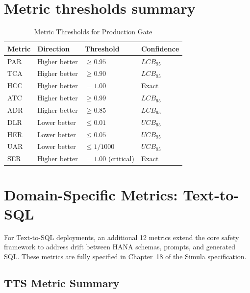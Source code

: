 \section{Metric thresholds summary}

\begin{table}[htbp]
\centering
\caption{Metric Thresholds for Production Gate}
\label{tab:thresholds}
\begin{tabular}{l l l l}
\toprule
\textbf{Metric} & \textbf{Direction} & \textbf{Threshold} & \textbf{Confidence} \\
\midrule
PAR & Higher better & $\geq 0.95$ & $LCB_{95}$ \\
TCA & Higher better & $\geq 0.90$ & $LCB_{95}$ \\
HCC & Higher better & $= 1.00$ & Exact \\
ATC & Higher better & $\geq 0.99$ & $LCB_{95}$ \\
ADR & Higher better & $\geq 0.85$ & $LCB_{95}$ \\
DLR & Lower better & $\leq 0.01$ & $UCB_{95}$ \\
HER & Lower better & $\leq 0.05$ & $UCB_{95}$ \\
UAR & Lower better & $\leq 1/1000$ & $UCB_{95}$ \\
SER & Higher better & $= 1.00$ (critical) & Exact \\
\bottomrule
\end{tabular}
\end{table}

\section{Domain-Specific Metrics: Text-to-SQL}
\label{sec:tts-metrics-extension}

For Text-to-SQL deployments, an additional 12 metrics extend the core safety
framework to address drift between HANA schemas, prompts, and generated SQL.
These metrics are fully specified in Chapter~18 of the Simula specification.

\subsection{TTS Metric Summary}

